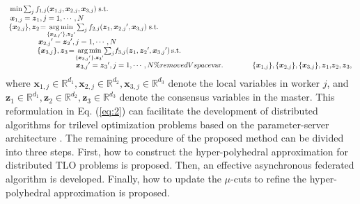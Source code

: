 \documentclass[letterpaper]{article} %
\begin{document}
\begin{equation}
\label{eq:2}
\begin{array}{l}
\min \sum\nolimits_{j} {{f_{1,j}}({\boldsymbol{x}_{1,j}},{\boldsymbol{x}_{2,j}},{\boldsymbol{x}_{3,j}})} \;{\rm{s}}.{\rm{t}}. \\

{\boldsymbol{x}_{1,j}} = {\boldsymbol{z}_1},j = 1, \cdots ,N \\

\! \{{\boldsymbol{x}_{2,j}}\} ,{\boldsymbol{z}_2} \!=\! \mathop {\arg \min }\limits_{\{ {\boldsymbol{x}_{2,j}}'\} ,{\boldsymbol{z}_2}'} \sum\nolimits_{j} {{f_{2,j}}({\boldsymbol{z}_1},{\boldsymbol{x}_{2,j}}',{\boldsymbol{x}_{3,j}})} \;{\rm{s}}.{\rm{t}}. \\

\qquad \quad \;\;\, \,  {\boldsymbol{x}_{2,j}}' = {\boldsymbol{z}_2}',j = 1, \cdots ,N \\

\qquad \quad \;\;\,   \{{\boldsymbol{x}_{3,j}}\} ,{\boldsymbol{z}_3} \!=\! \mathop {\arg \min }\limits_{\{{\boldsymbol{x}_{3,j}}'\},{\boldsymbol{z}_3}'} \! \sum\nolimits_{j} \!{{f_{3,j}}({\boldsymbol{z}_1},{\boldsymbol{z}_2}',{\boldsymbol{x}_{3,j}}')} \,{\rm{s}}.{\rm{t}}. \\

\qquad \qquad \qquad \qquad \quad   {\boldsymbol{x}_{3,j}}' = {\boldsymbol{z}_3}',j = 1, \cdots ,N \%removedVspace

{\mathop{\rm var}}. \qquad  \qquad \{{\boldsymbol{x}_{1,j}}\} ,{\rm{\{ }}{\boldsymbol{x}_{2,j}}\} ,{\rm{\{ }}{\boldsymbol{x}_{3,j}}\} ,{\boldsymbol{z}_1}{\rm{,}}{\boldsymbol{z}_2},{\boldsymbol{z}_3},
\end{array}
\end{equation}
where $\boldsymbol{x}_{1,j} \!\in\! \mathbb{R}^{d_1}, \boldsymbol{x}_{2,j}\!\in\! \mathbb{R}^{d_2}, \boldsymbol{x}_{3,j}\!\in\! \mathbb{R}^{d_3}$ denote the local variables in worker $j$, and $\boldsymbol{z}_1 \!\in\! \mathbb{R}^{d_1}, \boldsymbol{z}_2\!\in\! \mathbb{R}^{d_2}, \boldsymbol{z}_3\!\in\! \mathbb{R}^{d_3}$ denote the consensus variables in the master. This reformulation in Eq. (\ref{eq:2}) can facilitate the development of distributed algorithms for trilevel optimization problems based on the parameter-server architecture \cite{assran2020advances}. The remaining procedure of the proposed method can be divided into three steps. First, how to construct the hyper-polyhedral approximation for distributed TLO problems is proposed. Then, an effective asynchronous federated algorithm is developed. Finally, how to update the $\mu$-cuts to refine the hyper-polyhedral approximation is proposed.
\end{document}
